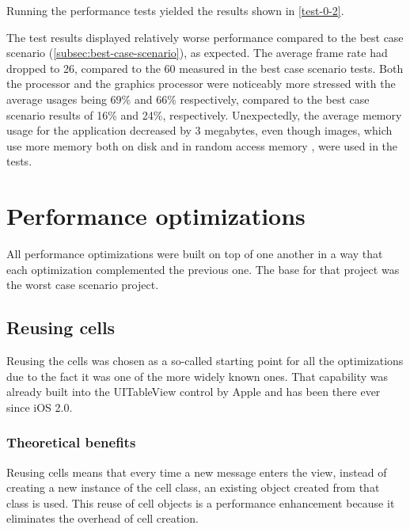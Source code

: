 \documentclass[a4paper,12pt]{article}
\begin{document}
Running the performance tests yielded the results shown in \autoref{test-0-2}.

The test results displayed relatively worse performance compared to the best case scenario (\autoref{subsec:best-case-scenario}), as expected. The average frame rate had dropped to 26, compared to the 60 measured in the best case scenario tests. Both the processor and the graphics processor were noticeably more stressed with the average usages being 69\% and 66\% respectively, compared to the best case scenario results of 16\% and 24\%, respectively. Unexpectedly, the average memory usage for the application decreased by 3 megabytes, even though images, which use more memory both on disk and in random access memory \cite{UnderstandingFileSizes}, were used in the tests.

\section{Performance optimizations}
All performance optimizations were built on top of one another in a way that each optimization complemented the previous one. The base for that project was the worst case scenario project. 

\subsection{Reusing cells}
Reusing the cells was chosen as a so-called starting point for all the optimizations due to the fact it was one of the more widely known ones. That capability was already built into the UITableView control by Apple and has been there ever since iOS 2.0.\cite{HackingWithSwiftCellReuse}

\subsubsection{Theoretical benefits}
Reusing cells means that every time a new message enters the view, instead of creating a new instance of the cell class, an existing object created from that class is used. This reuse of cell objects is a performance enhancement because it eliminates the overhead of cell creation.\cite{AppleCharacteristicsOfCellObjects}
\end{document}
